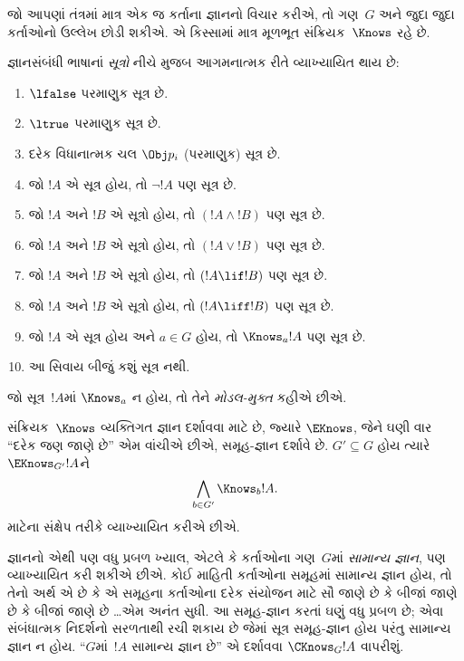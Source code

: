 જો આપણાં તંત્રમાં માત્ર એક જ કર્તાના જ્ઞાનનો વિચાર કરીએ, તો
ગણ~$G$ અને જુદા જુદા કર્તાઓનો ઉલ્લેખ છોડી શકીએ. એ કિસ્સામાં
માત્ર મૂળભૂત સંક્રિયક~$\Knows$ રહે છે.

\begin{defn}
જ્ઞાનસંબંધી ભાષાનાં \emph{સૂત્રો} નીચે મુજબ આગમનાત્મક રીતે
  વ્યાખ્યાયિત થાય છે:
\begin{enumerate}
\item $\lfalse$ પરમાણુક સૂત્ર છે.

\item $\ltrue$ પરમાણુક સૂત્ર છે.

\item દરેક વિધાનાત્મક ચલ $\Obj p_i$ (પરમાણુક) સૂત્ર છે.

\item જો $!A$ એ સૂત્ર હોય, તો $\lnot !A$ પણ
  સૂત્ર છે.

\item જો $!A$ અને $!B$ એ સૂત્રો હોય, તો $(!A \land
  !B)$ પણ સૂત્ર છે.

\item જો $!A$ અને $!B$ એ સૂત્રો હોય, તો $(!A \lor !B)$
  પણ સૂત્ર છે.

\item જો $!A$ અને $!B$ એ સૂત્રો હોય, તો $(!A \lif !B)$
  પણ સૂત્ર છે.

\item જો $!A$ અને $!B$ એ સૂત્રો હોય, તો $(!A \liff !B)$
  પણ સૂત્ર છે.

\item જો $!A$ એ સૂત્ર હોય અને $a \in G$ હોય, તો $\Knows_a !A$
  પણ સૂત્ર છે.

\item આ સિવાય બીજું કશું સૂત્ર નથી.
\end{enumerate}
\end{defn}

જો સૂત્ર~$!A$માં $\Knows_a$ ન હોય, તો તેને
\emph{મોડલ-મુક્ત} કહીએ છીએ.

\begin{defn}
  સંક્રિયક~$\Knows$ વ્યક્તિગત જ્ઞાન દર્શાવવા માટે છે, જ્યારે
  $\EKnows$, જેને ઘણી વાર ``દરેક જણ જાણે છે'' એમ વાંચીએ છીએ,
  સમૂહ-જ્ઞાન દર્શાવે છે. $G' \subseteq G$ હોય ત્યારે
  $\EKnows_{G'} !A$ને \[\bigwedge_{b \in G'} \Knows_b !A.\]
  માટેના સંક્ષેપ તરીકે વ્યાખ્યાયિત કરીએ છીએ.
\end{defn}

જ્ઞાનનો એથી પણ વધુ પ્રબળ ખ્યાલ, એટલે કે કર્તાઓના ગણ~$G$માં
\emph{સામાન્ય જ્ઞાન}, પણ વ્યાખ્યાયિત કરી શકીએ છીએ. કોઈ માહિતી
કર્તાઓના સમૂહમાં સામાન્ય જ્ઞાન હોય, તો તેનો અર્થ એ છે કે એ સમૂહના
કર્તાઓના દરેક સંયોજન માટે સૌ જાણે છે કે બીજાં જાણે છે કે બીજાં
જાણે છે \dots એમ અનંત સુધી. આ સમૂહ-જ્ઞાન કરતાં ઘણું વધુ પ્રબળ
છે; એવા સંબંધાત્મક નિદર્શનો સરળતાથી રચી શકાય છે જેમાં
સૂત્ર સમૂહ-જ્ઞાન હોય પરંતુ સામાન્ય જ્ઞાન ન હોય.
``$G$માં~$!A$ સામાન્ય જ્ઞાન છે'' એ દર્શાવવા
$\CKnows_G !A$ વાપરીશું.
\endgroup

